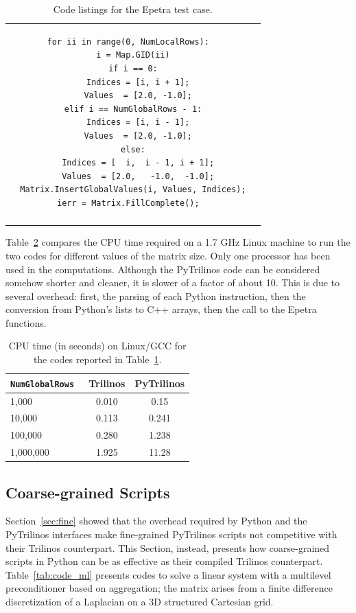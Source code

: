 \documentclass[10pt,relax]{SANDreport}
\begin{document}
\begin{table}
\begin{tabular}{| c  | c|}
\begin{minipage}{10.5cm}
\begin{verbatim}
for ii in range(0, NumLocalRows):
  i = Map.GID(ii)
  if i == 0:
    Indices = [i, i + 1];
    Values  = [2.0, -1.0];
  elif i == NumGlobalRows - 1:
    Indices = [i, i - 1];
    Values  = [2.0, -1.0];
  else:
    Indices = [  i,  i - 1, i + 1];
    Values  = [2.0,   -1.0,  -1.0];
  Matrix.InsertGlobalValues(i, Values, Indices);
ierr = Matrix.FillComplete();
\end{verbatim}
\end{minipage}
\\
&  \\
\hline
\end{tabular}
\caption{Code listings for the Epetra test case.}
\label{tab:code_epetra}
\end{table}

Table~\ref{tab:time_epetra} compares the CPU time required on a 1.7 GHz Linux
machine to run the two codes for different values of the matrix size. Only
one processor has been used in the computations. Although the PyTrilinos code
can be considered somehow shorter and cleaner, it is slower of a factor of
about 10. This is due to several overhead: first, the parsing of each Python
instruction, then the conversion from Python's lists to C++ arrays, then the
call to the Epetra functions.
\begin{table}
\begin{center}
\begin{tabular}{| l | c | c |}
\hline
\tt NumGlobalRows & Trilinos & PyTrilinos \\
\hline
1,000 & 0.010 & 0.15 \\
10,000 & 0.113 & 0.241 \\
100,000 & 0.280 & 1.238 \\
1,000,000 & 1.925 & 11.28 \\
\hline
\end{tabular}
\caption{CPU time (in seconds) on Linux/GCC for the codes reported in
Table~\ref{tab:code_epetra}.}
\label{tab:time_epetra}
\end{center}
\end{table}

\subsection{Coarse-grained Scripts}
\label{sec:coarse}

Section~\ref{sec:fine} showed that the overhead required by Python and the
PyTrilinos interfaces make
fine-grained PyTrilinos scripts not competitive with their Trilinos
counterpart. This Section, instead, presents how coarse-grained scripts in
Python can be as effective as their compiled Trilinos counterpart.
Table~\ref{tab:code_ml} presents codes to solve a linear system with a
multilevel preconditioner based on aggregation; the matrix arises from a
finite difference discretization of a Laplacian on a 3D structured Cartesian
grid.
\end{document}
